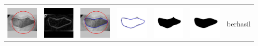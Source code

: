 \begin{table}[H]
\begin{tabular}{|m{0.7in}|m{0.7in}|m{0.7in}|m{0.7in}|m{0.7in}|m{0.7in}|m{0.7in}|}
		&  &  & & & &  \\
		\includegraphics[width=0.7in]{dataset/dataset_3/luka_merah/ready/24_interp_init.jpg}&
		\includegraphics[width=0.7in]{dataset/dataset_3/luka_merah/ready/24_interp_ext.jpg}&
		\includegraphics[width=0.7in]{dataset/dataset_3/luka_merah/ready/24_interp_result.jpg}&
		\includegraphics[width=0.7in]{dataset/dataset_3/luka_merah/ready/24_gt_r.jpg}&
		\includegraphics[width=0.7in]{dataset/dataset_3/luka_merah/ready/24_r.jpg}&
		\includegraphics[width=0.7in]{dataset/dataset_3/luka_merah/ready/24_interp_r.jpg}&
		berhasil\\
		\hline
		

\end{tabular}
\end{table}
